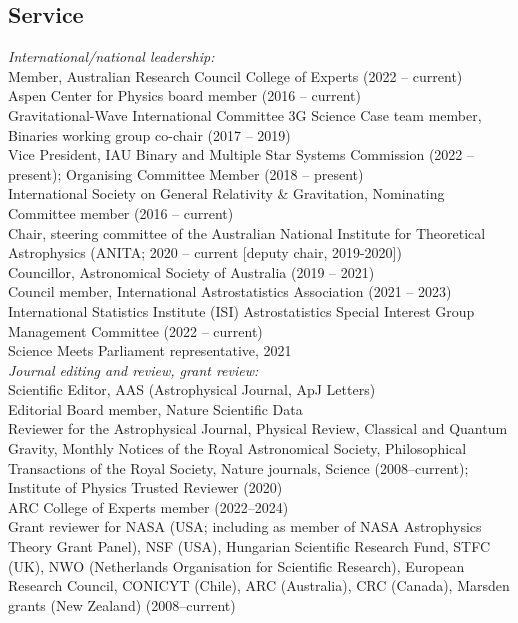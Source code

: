 \documentclass[margin,line]{res}
\begin{document}
\begin{resume}
\section{\sc Service}

{\it International/national leadership:}\\
Member, Australian Research Council College of Experts (2022 -- current)\\
Aspen Center for Physics board member (2016 -- current)\\
Gravitational-Wave International Committee 3G Science Case team member, Binaries working group co-chair (2017 -- 2019)\\
Vice President, IAU Binary and Multiple Star Systems Commission (2022 -- present); Organising Committee Member (2018 -- present)\\
International Society on General Relativity \& Gravitation, Nominating Committee member (2016 -- current)\\
Chair, steering committee of the Australian National Institute for Theoretical Astrophysics (ANITA; 2020 -- current [deputy chair, 2019-2020])\\
Councillor, Astronomical Society of Australia (2019 -- 2021)\\
Council member, International Astrostatistics Association (2021 -- 2023)\\
International Statistics Institute (ISI) Astrostatistics Special Interest Group Management Committee (2022 -- current)\\
Science Meets Parliament representative, 2021\\

{\it Journal editing and review, grant review:}\\
Scientific Editor, AAS (Astrophysical Journal, ApJ Letters)\\
Editorial Board member, Nature Scientific Data\\
Reviewer for the Astrophysical Journal, Physical Review, Classical and Quantum Gravity, Monthly Notices of the Royal Astronomical Society, Philosophical Transactions of the Royal Society, Nature journals, Science (2008--current); Institute of Physics Trusted Reviewer (2020) \\
ARC College of Experts member (2022--2024)\\
Grant reviewer for NASA (USA; including as member of NASA Astrophysics Theory Grant Panel), NSF (USA), Hungarian Scientific Research Fund, STFC (UK), NWO (Netherlands Organisation for Scientific Research), European Research Council, CONICYT (Chile), ARC (Australia), CRC (Canada), Marsden grants (New Zealand) (2008--current)\\


\end{resume}
\end{document}
